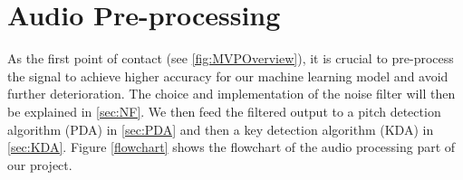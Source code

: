 \chapter{Audio Pre-processing} %

\label{Chapter5} %
As the first point of contact (see \cref{fig:MVPOverview}), it is crucial to pre-process the signal to achieve higher accuracy
for our machine learning model and avoid further deterioration.
The choice and implementation of the noise filter will then be explained in \cref{sec:NF}. We then feed the filtered output 
to a pitch detection algorithm (PDA) in \cref{sec:PDA} and then a key detection algorithm (KDA) in \cref{sec:KDA}.
Figure \cref{flowchart} shows the flowchart of the audio processing part of our project.

